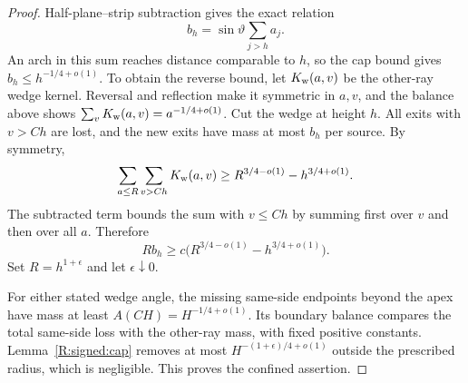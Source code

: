 \begin{proof}
Half-plane--strip subtraction gives the exact relation
\[
 b_h=\sin\vartheta\sum_{j>h}a_j.
\]
An arch in this sum reaches distance comparable to $h$, so the cap bound
gives $b_h\le h^{-1/4+o(1)}$. To obtain the reverse bound, let
$K_{\rm w}(a,v)$ be the other-ray wedge kernel. Reversal and reflection
make it symmetric in $a,v$, and the balance above shows
$\sum_vK_{\rm w}(a,v)=a^{-1/4+o(1)}$. Cut the wedge at height $h$.
All exits with $v>Ch$ are lost, and the new exits have mass at most
$b_h$ per source. By symmetry,
\[
 \sum_{a\le R}\sum_{v>Ch}K_{\rm w}(a,v)
 \ge R^{3/4-o(1)}-h^{3/4+o(1)}.
\]
The subtracted term bounds the sum with $v\le Ch$ by summing first over
$v$ and then over all $a$. Therefore
\[
 Rb_h\ge c\bigl(R^{3/4-o(1)}-h^{3/4+o(1)}\bigr).
\]
Set $R=h^{1+\epsilon}$ and let $\epsilon\downarrow0$.

For either stated wedge angle, the missing same-side endpoints beyond
the apex have mass at least $A(CH)=H^{-1/4+o(1)}$. Its boundary balance
compares the total same-side loss with the other-ray mass, with fixed
positive constants. Lemma~\ref{R:signed:cap} removes at most
$H^{-(1+\epsilon)/4+o(1)}$ outside the prescribed radius, which is
negligible. This proves the confined assertion.
\end{proof}

